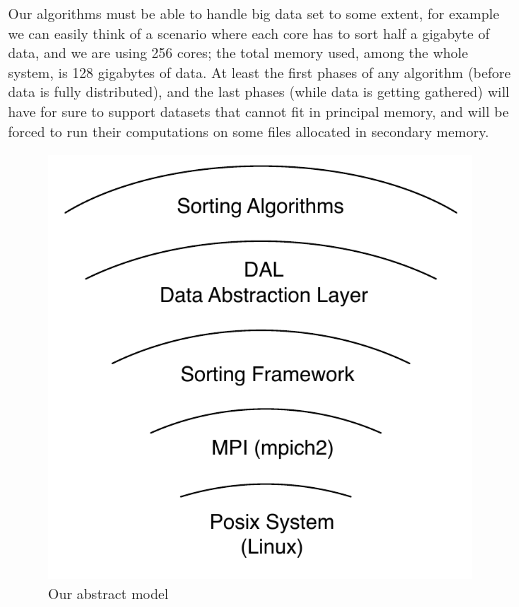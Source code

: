 Our algorithms must be able to handle big data set to some extent, for example we can easily think of a scenario where each core has to sort half a gigabyte of data, and we are using 256 cores; the total memory used, among the whole system, is 128 gigabytes of data.
At least the first phases of any algorithm (before data is fully distributed), and the last phases (while data is getting gathered) will have for sure to support datasets that cannot fit in principal memory, and will be forced to run their computations on some files allocated in secondary memory.

\begin{figure}
  \begin{center}
    \includegraphics[scale=0.50]{levels}
  \end{center}
  \caption{Our abstract model}
\end{figure}

